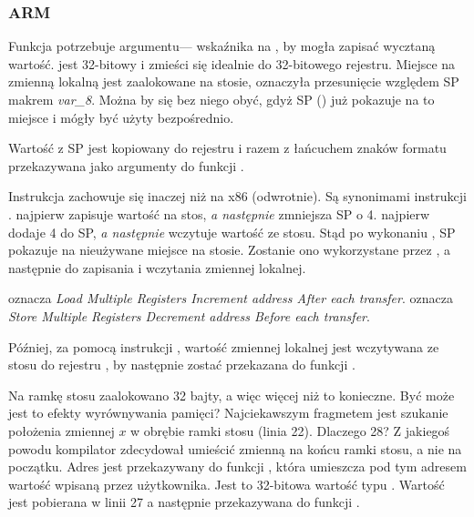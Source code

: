 \subsubsection{ARM}

\myparagraph{\OptimizingKeilVI (\ThumbMode)}



\myindex{\CLanguageElements!\Pointers}

Funkcja \scanf potrzebuje argumentu--- wskaźnika na \Tint, by mogła zapisać wycztaną wartość.
\Tint jest 32-bitowy i zmieści się idealnie do 32-bitowego rejestru.
Miejsce na zmienną lokalną  jest zaalokowane na stosie, \IDA
oznaczyła przesunięcie względem \ac{SP} makrem \emph{var\_8}. Można by się bez niego obyć, gdyż \ac{SP} () już pokazuje na to miejsce i mógły być użyty bezpośrednio.

Wartość z \ac{SP} jest kopiowany do rejestru  i razem z łańcuchem znaków formatu przekazywana jako argumenty do funkcji \scanf.

Instrukcja  zachowuje się inaczej niż na x86 (odwrotnie).
Są synonimami instrukcji \\ .
 najpierw zapisuje wartość na stos, \emph{a następnie} zmniejsza \ac{SP} o 4.
 najpierw dodaje 4 do \ac{SP}, \emph{a następnie} wczytuje wartość ze stosu.
Stąd po wykonaniu , \ac{SP} pokazuje na nieużywane miejsce na stosie.
Zostanie ono wykorzystane przez \scanf, a następnie \printf do zapisania i wczytania zmiennej lokalnej.

 oznacza \emph{Load Multiple Registers Increment address After each transfer}.
 oznacza \emph{Store Multiple Registers Decrement address Before each transfer}.

Później, za pomocą instrukcji , wartość zmiennej lokalnej jest wczytywana ze stosu do rejestru , by następnie zostać przekazana do funkcji \printf.




Na ramkę stosu zaalokowano 32 bajty, a więc więcej niż to konieczne. Być może jest to efekty wyrównywania pamięci?
Najciekawszym fragmetem jest szukanie położenia zmiennej $x$ w obrębie ramki stosu (linia 22).
Dlaczego 28? Z jakiegoś powodu kompilator zdecydował umieścić zmienną na końcu ramki stosu, a nie na początku.
Adres jest przekazywany do funkcji \scanf, która umieszcza pod tym adresem wartość wpisaną przez użytkownika.
Jest to 32-bitowa wartość typu \Tint.
Wartość jest pobierana w linii 27 a następnie przekazywana do funkcji \printf.

